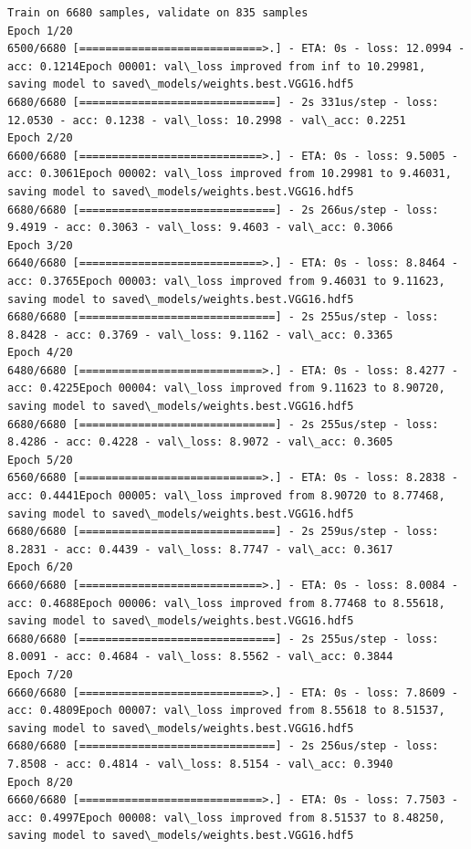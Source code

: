\documentclass[11pt]{article}
\begin{document}
    \begin{Verbatim}[commandchars=\\\{\}]
Train on 6680 samples, validate on 835 samples
Epoch 1/20
6500/6680 [============================>.] - ETA: 0s - loss: 12.0994 - acc: 0.1214Epoch 00001: val\_loss improved from inf to 10.29981, saving model to saved\_models/weights.best.VGG16.hdf5
6680/6680 [==============================] - 2s 331us/step - loss: 12.0530 - acc: 0.1238 - val\_loss: 10.2998 - val\_acc: 0.2251
Epoch 2/20
6600/6680 [============================>.] - ETA: 0s - loss: 9.5005 - acc: 0.3061Epoch 00002: val\_loss improved from 10.29981 to 9.46031, saving model to saved\_models/weights.best.VGG16.hdf5
6680/6680 [==============================] - 2s 266us/step - loss: 9.4919 - acc: 0.3063 - val\_loss: 9.4603 - val\_acc: 0.3066
Epoch 3/20
6640/6680 [============================>.] - ETA: 0s - loss: 8.8464 - acc: 0.3765Epoch 00003: val\_loss improved from 9.46031 to 9.11623, saving model to saved\_models/weights.best.VGG16.hdf5
6680/6680 [==============================] - 2s 255us/step - loss: 8.8428 - acc: 0.3769 - val\_loss: 9.1162 - val\_acc: 0.3365
Epoch 4/20
6480/6680 [============================>.] - ETA: 0s - loss: 8.4277 - acc: 0.4225Epoch 00004: val\_loss improved from 9.11623 to 8.90720, saving model to saved\_models/weights.best.VGG16.hdf5
6680/6680 [==============================] - 2s 255us/step - loss: 8.4286 - acc: 0.4228 - val\_loss: 8.9072 - val\_acc: 0.3605
Epoch 5/20
6560/6680 [============================>.] - ETA: 0s - loss: 8.2838 - acc: 0.4441Epoch 00005: val\_loss improved from 8.90720 to 8.77468, saving model to saved\_models/weights.best.VGG16.hdf5
6680/6680 [==============================] - 2s 259us/step - loss: 8.2831 - acc: 0.4439 - val\_loss: 8.7747 - val\_acc: 0.3617
Epoch 6/20
6660/6680 [============================>.] - ETA: 0s - loss: 8.0084 - acc: 0.4688Epoch 00006: val\_loss improved from 8.77468 to 8.55618, saving model to saved\_models/weights.best.VGG16.hdf5
6680/6680 [==============================] - 2s 255us/step - loss: 8.0091 - acc: 0.4684 - val\_loss: 8.5562 - val\_acc: 0.3844
Epoch 7/20
6660/6680 [============================>.] - ETA: 0s - loss: 7.8609 - acc: 0.4809Epoch 00007: val\_loss improved from 8.55618 to 8.51537, saving model to saved\_models/weights.best.VGG16.hdf5
6680/6680 [==============================] - 2s 256us/step - loss: 7.8508 - acc: 0.4814 - val\_loss: 8.5154 - val\_acc: 0.3940
Epoch 8/20
6660/6680 [============================>.] - ETA: 0s - loss: 7.7503 - acc: 0.4997Epoch 00008: val\_loss improved from 8.51537 to 8.48250, saving model to saved\_models/weights.best.VGG16.hdf5

\end{Verbatim}
\end{document}
